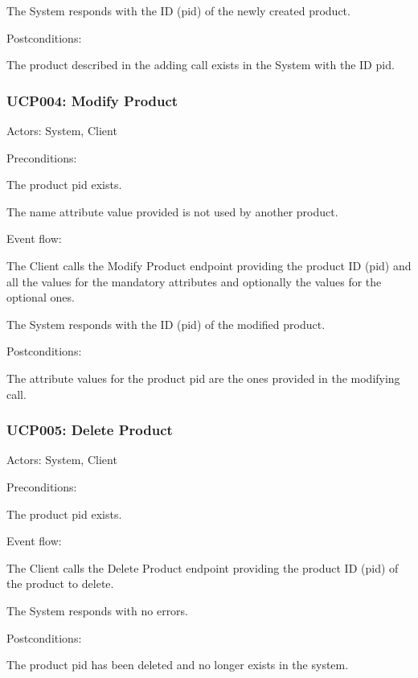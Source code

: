 \ucitem The System responds with the ID (pid) of the newly created product.

Postconditions:

\ucitem The product described in the adding call exists in the System with the ID pid.

\subsubsection{UCP004: Modify Product}
\label{UCP004}

Actors: System, Client

Preconditions:

\ucitem The product pid exists.

\ucitem The name attribute value provided is not used by another product.

Event flow:

\ucitem The Client calls the Modify Product endpoint providing the product ID (pid) and all the values for the mandatory attributes and optionally the values for the optional ones.

\ucitem The System responds with the ID (pid) of the modified product.

Postconditions:

\ucitem The attribute values for the product pid are the ones provided in the modifying call.

\subsubsection{UCP005: Delete Product}
\label{UCP005}

Actors: System, Client

Preconditions:

\ucitem The product pid exists.

Event flow:

\ucitem The Client calls the Delete Product endpoint providing the product ID (pid) of the product to delete.

\ucitem The System responds with no errors.

Postconditions:

\ucitem The product pid has been deleted and no longer exists in the system.
